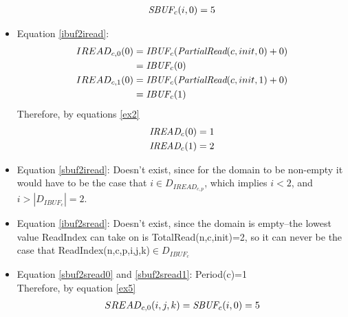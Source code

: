 \begin{itemize}
\begin{align}
\mbox{\it SBUF}_c(i,0)=5\label{ex5}
\end{align}
\item Equation \ref{ibuf2iread}:
\begin{align}
IREAD_{c,0}(0)&=\mbox{\it IBUF}_c(\mbox{\it PartialRead}(c,init,0)+0)\nonumber\\
&=\mbox{\it IBUF}_c(0)\label{ex6}\\
IREAD_{c,1}(0)&=\mbox{\it IBUF}_c(\mbox{\it PartialRead}(c,init,1)+0)\nonumber\\
&=\mbox{\it IBUF}_c(1)\nonumber
\end{align}
Therefore, by equations \ref{ex2}
\begin{align}
\mbox{\it IREAD}_c(0)&=1\label{ex7}\\
\mbox{\it IREAD}_c(1)&=2\nonumber
\end{align}
\item Equation \ref{sbuf2iread}: Doesn't exist, since for the domain to be non-empty it would have to be the case that $i\in D_{IREAD_{c,p}}$, which implies $i<2$, and $i>|D_{IBUF_c}|=2$.
\item Equation \ref{ibuf2sread}: Doesn't exist, since the domain is empty--the lowest value ReadIndex can take on is TotalRead(n,c,init)=2, so it can never be the case that ReadIndex(n,c,p,i,j,k)$\in D_{IBUF_c}$
\item Equation \ref{sbuf2sread0} and \ref{sbuf2sread1}: Period(c)=1\\
Therefore, by equation \ref{ex5}
\begin{align}
SREAD_{c,0}(i,j,k)=\mbox{\it SBUF}_c(i,0)=5
\end{align}
\end{itemize}
